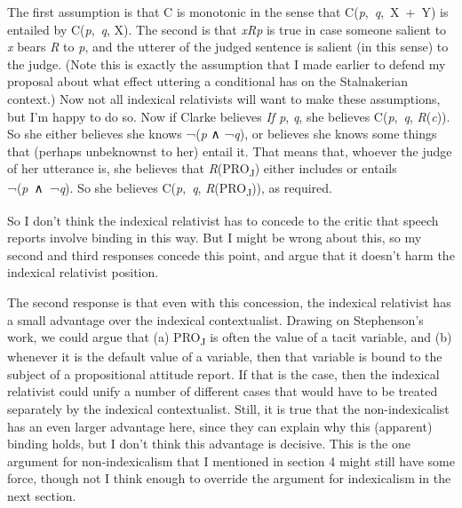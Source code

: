 \documentclass[
  10pt,
  letterpaper,
  DIV=11,
  numbers=noendperiod,
  twoside]{scrartcl}
\begin{document}
The first assumption is that C is monotonic in the sense that
C(\emph{p},~\emph{q},~X~+~Y) is entailed by C(\emph{p},~\emph{q}, X).
The second is that \emph{xRp} is true in case someone salient to
\emph{x} bears \emph{R} to \emph{p}, and the utterer of the judged
sentence is salient (in this sense) to the judge. (Note this is exactly
the assumption that I made earlier to defend my proposal about what
effect uttering a conditional has on the Stalnakerian context.) Now not
all indexical relativists will want to make these assumptions, but I'm
happy to do so. Now if Clarke believes \emph{If p}, \emph{q}, she
believes C(\emph{p},~\emph{q}, \emph{R}(\emph{c})). So she either
believes she knows ¬(\emph{p} ∧ ¬\emph{q}), or believes she knows some
things that (perhaps unbeknownst to her) entail it. That means that,
whoever the judge of her utterance is, she believes that
\emph{R}(PRO\textsubscript{J}) either includes or entails
¬(\emph{p}~∧~¬\emph{q}). So she believes C(\emph{p},~\emph{q},
\emph{R}(PRO\textsubscript{J})), as required.

So I don't think the indexical relativist has to concede to the critic
that speech reports involve binding in this way. But I might be wrong
about this, so my second and third responses concede this point, and
argue that it doesn't harm the indexical relativist position.

The second response is that even with this concession, the indexical
relativist has a small advantage over the indexical contextualist.
Drawing on Stephenson's work, we could argue that (a)
PRO\textsubscript{J} is often the value of a tacit variable, and (b)
whenever it is the default value of a variable, then that variable is
bound to the subject of a propositional attitude report. If that is the
case, then the indexical relativist could unify a number of different
cases that would have to be treated separately by the indexical
contextualist. Still, it is true that the non-indexicalist has an even
larger advantage here, since they can explain why this (apparent)
binding holds, but I don't think this advantage is decisive. This is the
one argument for non-indexicalism that I mentioned in section 4 might
still have some force, though not I think enough to override the
argument for indexicalism in the next section.
\end{document}

